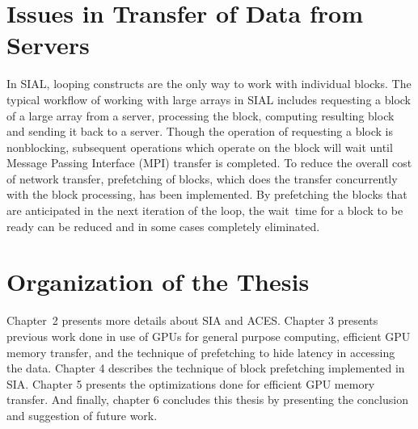 \section{Issues in Transfer of Data from Servers}
In SIAL, looping constructs are the only way to work with individual blocks.
The typical workflow of working with large arrays in SIAL includes requesting a
block of a large array from a server,
processing the block, computing resulting block and sending it back to a server. Though
the operation of requesting a block is nonblocking, subsequent operations
which operate on the block will wait until Message Passing Interface (MPI)
transfer is completed. To reduce the overall cost of network
transfer, prefetching of blocks, which does the transfer concurrently
with the block processing, has been implemented. By prefetching the blocks that are anticipated in
the next iteration of the loop, the wait~time for a block to be ready
can be reduced and in some cases completely eliminated.

\section{Organization of the Thesis}
Chapter~2 presents more details about SIA and ACES. Chapter 3 presents previous work done in use of GPUs for general purpose
computing, efficient GPU memory transfer, and the technique of prefetching to hide
latency in accessing the data.
Chapter 4 describes the technique of block prefetching implemented in SIA. Chapter 5
presents the optimizations done for efficient GPU memory transfer. And
finally, chapter 6 concludes this thesis by presenting the conclusion and suggestion
of future work.
